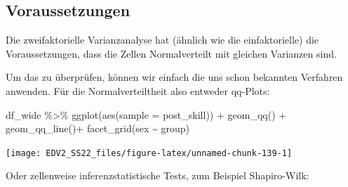 \documentclass[
]{book}
\newenvironment{Shaded}{\begin{snugshade}}{\end{snugshade}}
\newcommand{\AttributeTok}[1]{\textcolor[rgb]{0.77,0.63,0.00}{#1}}
\newcommand{\DecValTok}[1]{\textcolor[rgb]{0.00,0.00,0.81}{#1}}
\newcommand{\FunctionTok}[1]{\textcolor[rgb]{0.00,0.00,0.00}{#1}}
\newcommand{\NormalTok}[1]{#1}
\newcommand{\OtherTok}[1]{\textcolor[rgb]{0.56,0.35,0.01}{#1}}
\newcommand{\SpecialCharTok}[1]{\textcolor[rgb]{0.00,0.00,0.00}{#1}}
\newcommand{\StringTok}[1]{\textcolor[rgb]{0.31,0.60,0.02}{#1}}
\begin{document}
\hypertarget{voraussetzungen}{%
\subsection{Voraussetzungen}\label{voraussetzungen}}

Die zweifaktorielle Varianzanalyse hat (ähnlich wie die einfaktorielle) die Voraussetzungen, dass die Zellen Normalverteilt mit gleichen Varianzen sind.

Um das zu überprüfen, können wir einfach die uns schon bekannten Verfahren anwenden. Für die Normalverteiltheit also entweder qq-Plots:

\begin{Shaded}
\begin{Highlighting}[]
\NormalTok{df\_wide }\SpecialCharTok{\%\textgreater{}\%} 
  \FunctionTok{ggplot}\NormalTok{(}\FunctionTok{aes}\NormalTok{(}\AttributeTok{sample =}\NormalTok{ post\_skill)) }\SpecialCharTok{+}
  \FunctionTok{geom\_qq}\NormalTok{() }\SpecialCharTok{+}
  \FunctionTok{geom\_qq\_line}\NormalTok{()}\SpecialCharTok{+}
  \FunctionTok{facet\_grid}\NormalTok{(sex }\SpecialCharTok{\textasciitilde{}}\NormalTok{ group) }
\end{Highlighting}
\end{Shaded}

\begin{center}\texttt{[image: EDV2\_SS22\_files/figure-latex/unnamed-chunk-139-1]} \end{center}

Oder zellenweise inferenzstatistische Tests, zum Beispiel Shapiro-Wilk:

\begin{Shaded}
\end{Shaded}
\end{document}
